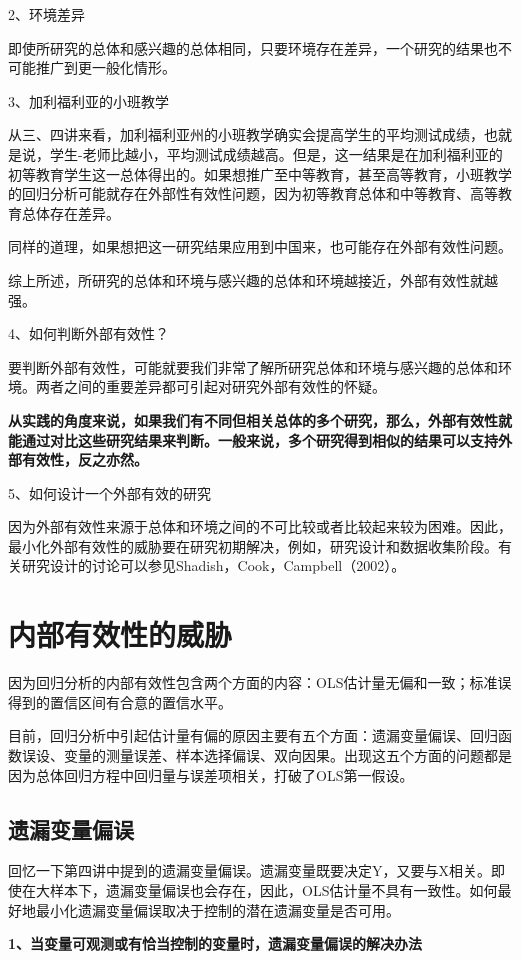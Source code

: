 \documentclass[cn,12pt,math=newtx,citestyle=gb7714-2015,bibstyle=gb7714-2015]{elegantbook}
\begin{document}
2、环境差异

即使所研究的总体和感兴趣的总体相同，只要环境存在差异，一个研究的结果也不可能推广到更一般化情形。

3、加利福利亚的小班教学

从三、四讲来看，加利福利亚州的小班教学确实会提高学生的平均测试成绩，也就是说，学生-老师比越小，平均测试成绩越高。但是，这一结果是在加利福利亚的初等教育学生这一总体得出的。如果想推广至中等教育，甚至高等教育，小班教学的回归分析可能就存在外部性有效性问题，因为初等教育总体和中等教育、高等教育总体存在差异。

同样的道理，如果想把这一研究结果应用到中国来，也可能存在外部有效性问题。

综上所述，所研究的总体和环境与感兴趣的总体和环境越接近，外部有效性就越强。

4、如何判断外部有效性？

要判断外部有效性，可能就要我们非常了解所研究总体和环境与感兴趣的总体和环境。两者之间的重要差异都可引起对研究外部有效性的怀疑。

\textbf{从实践的角度来说，如果我们有不同但相关总体的多个研究，那么，外部有效性就能通过对比这些研究结果来判断。一般来说，多个研究得到相似的结果可以支持外部有效性，反之亦然。}

5、如何设计一个外部有效的研究

因为外部有效性来源于总体和环境之间的不可比较或者比较起来较为困难。因此，最小化外部有效性的威胁要在研究初期解决，例如，研究设计和数据收集阶段。有关研究设计的讨论可以参见Shadish，Cook，Campbell（2002）。

\section{内部有效性的威胁}
因为回归分析的内部有效性包含两个方面的内容：OLS估计量无偏和一致；标准误得到的置信区间有合意的置信水平。

目前，回归分析中引起估计量有偏的原因主要有五个方面：遗漏变量偏误、回归函数误设、变量的测量误差、样本选择偏误、双向因果。出现这五个方面的问题都是因为总体回归方程中回归量与误差项相关，打破了OLS第一假设。

\subsection{遗漏变量偏误}
回忆一下第四讲中提到的遗漏变量偏误。遗漏变量既要决定Y，又要与X相关。即使在大样本下，遗漏变量偏误也会存在，因此，OLS估计量不具有一致性。如何最好地最小化遗漏变量偏误取决于控制的潜在遗漏变量是否可用。

\textbf{1、当变量可观测或有恰当控制的变量时，遗漏变量偏误的解决办法}
\end{document}
